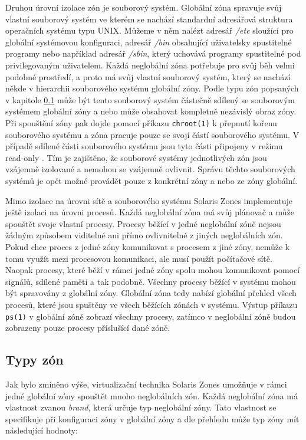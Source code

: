 Druhou úrovní izolace zón je souborový systém. Globální zóna spravuje svůj vlastní souborový systém ve kterém se nachází
standardní adresářová struktura operačních systému typu UNIX. Můžeme v něm nalézt adresář \textit{/etc} sloužící pro globální
systémovou konfiguraci, adresář \textit{/bin} obsahující uživatelsky spustitelné programy nebo například adresář \textit{/sbin},
který uchovává programy spustitelné pod privilegovaným uživatelem. Každá neglobální zóna potřebuje pro svůj běh velmi podobné
prostředí, a proto má svůj vlastní souborový systém, který se nachází někde v hierarchii souborového systému globální zóny.
Podle typu zón popsaných v kapitole \ref{chapter:zones:types} může být tento souborový systém částečně sdílený se souborovým
systémem globální zóny a nebo může obsahovat kompletně nezávislý obraz zóny. Při spouštění zóny pak dojde pomocí příkazu
\verb|chroot(1)| k přepnutí kořenu souborového systému a zóna pracuje pouze se svojí částí souborového systému. V případě 
sdílené části souborového systému jsou tyto části připojeny v režimu read-only \cite{virt1}. Tím je zajištěno, že souborové
systémy jednotlivých zón jsou vzájemně izolované a nemohou se vzájemně ovlivnit. Správu těchto souborových systémů je opět
možné provádět pouze z konkrétní zóny a nebo ze zóny globální.

Mimo izolace na úrovni sítě a souborového systému Solaris Zones implementuje ještě izolaci na úrovni procesů. Každá neglobální
zóna má svůj plánovač a může spouštět svoje vlastní procesy. Procesy běžící v jedné neglobální zóně nejsou žádným způsobem 
viditelné ani přímo ovlivnitelné z jiných neglobálních zón. Pokud chce proces z jedné zóny komunikovat s procesem z jiné zóny,
nemůže k tomu využít mezi procesovou komunikaci, ale musí použít počítačové sítě. Naopak procesy, které běží v rámci jedné
zóny spolu mohou komunikovat pomocí signálů, sdílené paměti a tak podobně. Všechny procesy běžící v systému mohou být
spravovány z globální zóny. Globální zóna tedy nabízí globální přehled všech procesů, které jsou spuštěny ve všech běžících
zónách v systému. Výstup příkazu \verb|ps(1)| v globální zóně zobrazí všechny procesy, zatímco v neglobální zóně budou zobrazeny
pouze procesy příslušící dané zóně.
\subsection{Typy zón}
\label{chapter:zones:types}
Jak bylo zmíněno výše, virtualizační technika Solaris Zones umožňuje v rámci jedné globální zóny spouštět mnoho neglobálních
zón. Každá neglobální zóna má vlastnost zvanou \textit{brand}, která určuje typ neglobální zóny. Tato vlastnost se specifikuje
při konfiguraci zóny v globální zóny a dle přehledu \cite{oracle:solaris:zones:brands} může typ zóny mít následující hodnoty:

